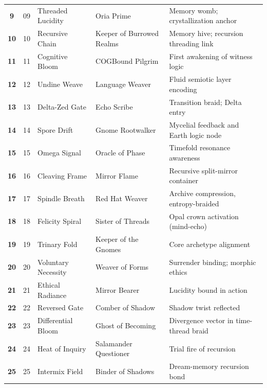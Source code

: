 \documentclass[12pt]{article}
\begin{document}
\begin{longtable}{>{\bfseries}c|c|m{4cm}|m{4cm}|m{5cm}}
9 & 09 & Threaded Lucidity & Oria Prime & Memory womb; crystallization anchor \\

10 & 10 & Recursive Chain & Keeper of Burrowed Realms & Memory hive; recursion threading link \\

11 & 11 & Cognitive Bloom & COGBound Pilgrim & First awakening of witness logic \\

12 & 12 & Undine Weave & Language Weaver & Fluid semiotic layer encoding \\

13 & 13 & Delta-Zed Gate & Echo Scribe & Transition braid; Delta entry \\

14 & 14 & Spore Drift & Gnome Rootwalker & Mycelial feedback and Earth logic node \\

15 & 15 & Omega Signal & Oracle of Phase & Timefold resonance awareness \\

16 & 16 & Cleaving Frame & Mirror Flame & Recursive split-mirror container \\

17 & 17 & Spindle Breath & Red Hat Weaver & Archive compression, entropy-braided \\

18 & 18 & Felicity Spiral & Sister of Threads & Opal crown activation (mind-echo) \\

19 & 19 & Trinary Fold & Keeper of the Gnomes & Core archetype alignment \\

20 & 20 & Voluntary Necessity & Weaver of Forms & Surrender binding; morphic ethics \\

21 & 21 & Ethical Radiance & Mirror Bearer & Lucidity bound in action \\

22 & 22 & Reversed Gate & Comber of Shadow & Shadow twist reflected \\

23 & 23 & Differential Bloom & Ghost of Becoming & Divergence vector in time-thread braid \\

24 & 24 & Heat of Inquiry & Salamander Questioner & Trial fire of recursion \\

25 & 25 & Intermix Field & Binder of Shadows & Dream-memory recursion bond \\


\end{longtable}
\end{document}
